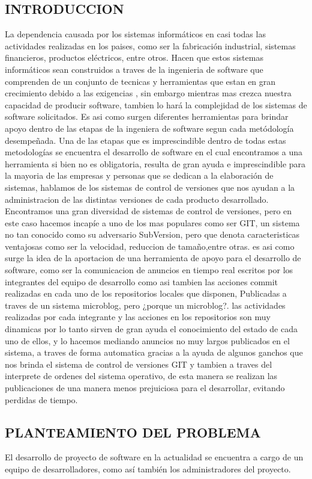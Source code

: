 \subsection{INTRODUCCION}
La dependencia causada por los sistemas informáticos en casi todas las actividades realizadas en los paises, como ser la fabricación industrial, sistemas financieros, productos eléctricos, entre otros.
Hacen que estos sistemas informáticos sean construidos a traves de la ingenieria de software que comprenden de un conjunto de tecnicas y herramientas que estan en gran crecimiento debido a las exigencias , sin embargo mientras mas crezca nuestra capacidad de producir software, tambien lo hará la complejidad de los sistemas de software solicitados.
Es asi como surgen diferentes herramientas para brindar apoyo dentro de las etapas de la ingeniera de software segun cada metódología desempeñada. Una de las etapas que es imprescindible dentro de todas estas metodologías se encuentra el desarrollo de software en el cual encontramos a una herramienta si bien no es obligatoria, resulta de gran ayuda e imprescindible para la mayoria de las empresas y personas que se dedican a la elaboración de sistemas, hablamos de los sistemas de control de versiones que nos ayudan a la administracion de las distintas versiones de cada producto desarrollado.
Encontramos una gran diversidad de sistemas de control de versiones, pero en este caso hacemos incapíe a uno de los mas populares como ser GIT, un sistema no tan conocido como su adversario SubVersion, pero que denota caracteristicas ventajosas como ser la velocidad, reduccion de tamaño,entre otras. es asi como surge la idea de la aportacion de una herramienta de apoyo para el desarrollo de software, como ser la comunicacion de anuncios en tiempo real escritos por los integrantes del equipo de desarrollo como asi tambien las acciones commit realizadas en cada uno de los repositorios locales que disponen, Publicadas a traves de un sistema microblog, pero ¿porque un microblog?. las actividades realizadas por cada integrante y las acciones en los repositorios son muy dinamicas por lo tanto sirven de gran ayuda el conocimiento del estado de cada uno de ellos, y lo hacemos mediando anuncios no muy largos publicados en el sistema, a traves de forma automatica gracias a la ayuda de algunos ganchos que nos brinda el sistema de control de versiones GIT y tambien a traves del interprete de ordenes del sistema operativo, de esta manera se realizan las publicaciones de una manera menos prejuiciosa para el desarrollar, evitando perdidas de tiempo.
\subsection{PLANTEAMIENTO DEL PROBLEMA}
El desarrollo de proyecto de software en la actualidad se encuentra a cargo de un equipo de desarrolladores, como así también los administradores del proyecto.

